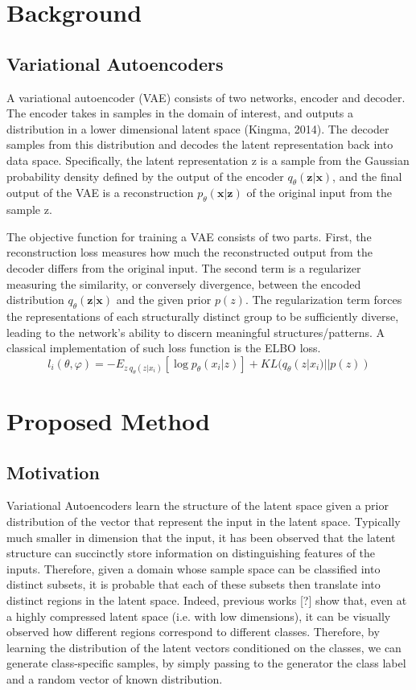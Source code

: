\documentclass{article}
\begin{document}
\section{Background}
\subsection{Variational Autoencoders}

A variational autoencoder (VAE) consists of two networks, encoder and decoder. The encoder
takes in samples in the domain of interest, and outputs a distribution in a lower dimensional
latent space (Kingma, 2014). The decoder samples from this distribution and decodes the latent representation
back into data space. Specifically, the latent representation z is a sample from the Gaussian
probability density defined by the output of the encoder $q_\theta(\mathbf{z}|\mathbf{x})$, and
the final output of the VAE is a reconstruction $p_\theta(\mathbf{x}|\mathbf{z})$ of the original input 
from the sample z. \par
The objective function for training a VAE consists of two parts. First, the reconstruction loss measures how much the reconstructed output from the decoder differs from the original input. The second term is a regularizer measuring the similarity, or conversely divergence, between the encoded distribution $q_\theta(\mathbf{z}|\mathbf{x})$ and the given prior $p(z)$. The regularization term forces the representations of each structurally distinct group to be sufficiently diverse, leading to the network's ability to discern meaningful structures/patterns. A classical implementation of such loss function is the ELBO loss.
\begin{equation} 
l_i(\theta, \varphi) = - E_{z~q_\theta(z|x_i)} [\log{p_\theta(x_i|z)}]+KL(q_\theta(z|x_i)||p(z))
\end{equation}

\section{Proposed Method}
\subsection{Motivation}

Variational Autoencoders learn the structure of the latent space given a prior distribution of the vector that represent the input in the latent space. Typically much smaller in dimension that the input, it has been observed that the latent structure can succinctly store information on distinguishing features of the inputs. Therefore, given a domain whose sample space can be classified into distinct subsets, it is probable that each of these subsets then translate into distinct regions in the latent space. Indeed, previous works [?] show that, even at a highly compressed latent space (i.e. with low dimensions), it can be visually observed how different regions correspond to different classes.
Therefore, by learning the distribution of the latent vectors conditioned on the classes, we can generate class-specific samples, by simply passing to the generator the class label and a random vector of known distribution.
\end{document}
